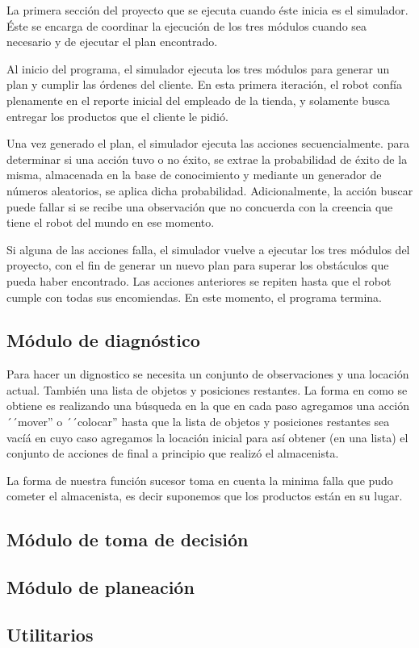 \documentclass[11pt]{article}
\begin{document}
La primera sección del proyecto que se ejecuta cuando éste inicia es el simulador. Éste se encarga de coordinar la ejecución de los tres módulos cuando sea necesario y de ejecutar el plan encontrado.

Al inicio del programa, el simulador ejecuta los tres módulos para generar un plan y cumplir las órdenes del cliente. En esta primera iteración, el robot confía plenamente en el reporte inicial del empleado de la tienda, y solamente busca entregar los productos que el cliente le pidió.

Una vez generado el plan, el simulador ejecuta las acciones secuencialmente. para determinar si una acción tuvo o no éxito, se extrae la probabilidad de éxito de la misma, almacenada en la base de conocimiento y mediante un generador de números aleatorios, se aplica dicha probabilidad. Adicionalmente, la acción buscar puede fallar si se recibe una observación que no concuerda con la creencia que tiene el robot del mundo en ese momento.

Si alguna de las acciones falla, el simulador vuelve a ejecutar los tres módulos del proyecto, con el fin de generar un nuevo plan para superar los obstáculos que pueda haber encontrado. Las acciones anteriores se repiten hasta que el robot cumple con todas sus encomiendas. En este momento, el programa termina.

\subsection{Módulo de diagnóstico}

Para hacer un dignostico se necesita un conjunto de observaciones y una
locación actual. También una lista de objetos y posiciones restantes.
La forma en como se obtiene es realizando una búsqueda en la que en cada
paso agregamos una acción ´´mover'' o ´´colocar'' hasta que la lista de
objetos y posiciones restantes sea vacíá en cuyo caso agregamos la
locación inicial para así obtener (en una lista) el conjunto de acciones
de final a principio que realizó el almacenista.

La forma de nuestra función sucesor toma en cuenta la minima falla que pudo
cometer el almacenista, es decir suponemos que los productos están en su
lugar.

\subsection{Módulo de toma de decisión}

\subsection{Módulo de planeación}


\subsection{Utilitarios}
\end{document}
